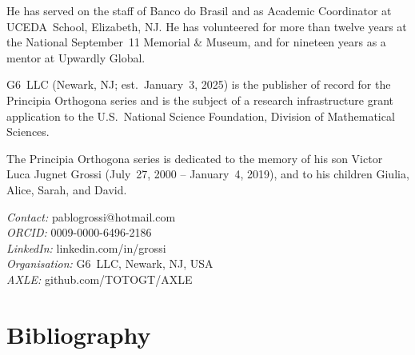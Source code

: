 \documentclass[12pt, oneside]{book}
\theoremstyle{plain}
\theoremstyle{definition}
\theoremstyle{remark}
\begin{document}
He has served on the staff of Banco do Brasil and as Academic
Coordinator at UCEDA~School, Elizabeth, NJ. He has volunteered
for more than twelve years at the National September~11 Memorial
\& Museum, and for nineteen years as a mentor at Upwardly Global.

G6~LLC (Newark, NJ; est.\ January~3, 2025) is the publisher
of record for the Principia Orthogona series and is the subject
of a research infrastructure grant application to the U.S.\
National Science Foundation, Division of Mathematical Sciences.

The Principia Orthogona series is dedicated to the memory of
his son Victor Luca Jugnet Grossi (July~27, 2000 -- January~4,
2019), and to his children Giulia, Alice, Sarah, and David.

\bigskip
\noindent\textit{Contact:} pablogrossi@hotmail.com\\
\textit{ORCID:} 0009-0000-6496-2186\\
\textit{LinkedIn:} linkedin.com/in/grossi\\
\textit{Organisation:} G6~LLC, Newark, NJ, USA\\
\textit{AXLE:} github.com/TOTOGT/AXLE

\chapter*{Bibliography}
\end{document}
